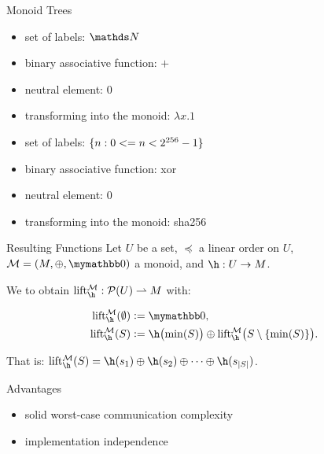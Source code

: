 \documentclass{beamer}
\begin{document}
\begin{frame}{Monoid Trees}
    \begin{itemize}
        \item set of labels: $\N$
        \item binary associative function: $+$
        \item neutral element: $0$\pause\pause
        \item transforming into the monoid: $\lambda x.1$
    \end{itemize}
    \vfill
    \begin{itemize}
        \item<4-> set of labels: $\{n : 0 <= n < 2^{256} - 1\}$
        \item<5-> binary associative function: xor
        \item<5-> neutral element: $0$
        \item<4-> transforming into the monoid: sha256
    \end{itemize}
\end{frame}

\begin{frame}{Resulting Functions}
    Let $U$ be a set, $\preceq$ a linear order on $U$, $\mathcal{M} = (M, \groupaddsym, \neutraladd)$ a monoid, and $\fun{\h}{U}{M}$.

    We  to obtain $\partialfun{\lift{\h}{\mathcal{M}}}{\powerset{U}}{M}$ with:

    \begin{align*}
    \lift{\h}{\mathcal{M}}(\emptyset) &\defeq \neutraladd,\\
    \lift{\h}{\mathcal{M}}(S) &\defeq \h\bigl(\min(S)\bigr) \oplus \lift{\h}{\mathcal{M}}\bigl(S \setminus \set{\min(S)}\bigr).\\
    \end{align*}

    That is: $\lift{\h}{\mathcal{M}}(S) = \groupadd{\h(s_1)}{\groupadd{\h(s_2)}{\groupadd{\cdots}{\h(s_{\abs{S}})}}}$.
\end{frame}

\begin{frame}{Advantages}
    \begin{itemize}
        \item solid worst-case communication complexity
        \item implementation independence
    \end{itemize}
\end{frame}
\end{document}
